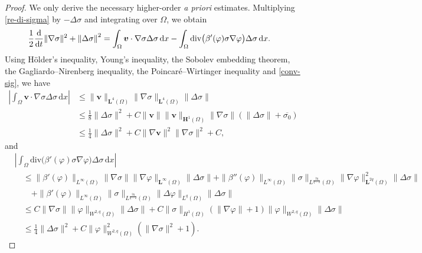 \documentclass[10pt,a4paper]{amsart}
\def\L{\bm{L}}
\def\vv{\bm{v}}
\begin{document}
\begin{proof}
We only derive the necessary higher-order \textit{a priori} estimates.
Multiplying \eqref{re-di-sigma} by $-\Delta\sigma$ and integrating over $\Omega$, we obtain
%
\begin{equation}
\begin{aligned}
\frac{1}{2}\frac{\mathrm{d}}{\mathrm{d} t}\|\nabla \sigma\|^2+\left\|\Delta\sigma\right\|^2
&=\int_{\Omega}\vv \cdot \nabla \sigma\Delta\sigma\,\mathrm{d}x
- \int_{\Omega}\mathrm{div}\big(\beta'(\varphi)\sigma \nabla \varphi\big) \Delta\sigma \,\mathrm{d}x.
\end{aligned}
\notag
\end{equation}
%
Using H\"older's inequality, Young's inequality, the Sobolev embedding theorem, the Gagliardo--Nirenberg inequality, the Poincar\'e--Wirtinger inequality and \eqref{conv-sig}, we have
%
\begin{equation*}
\begin{aligned}
\left|\int_{\Omega}\vv \cdot \nabla \sigma \Delta\sigma \,\mathrm{d}x\right|
&\le \|\vv \|_{\L^4(\Omega)}\|\nabla \sigma\|_{\bm{L}^4(\Omega)}\|\Delta\sigma\|\\
&\le \frac18\|\Delta\sigma\|^2 + C\|\vv \|\|\vv \|_{\bm{H}^1(\Omega)}
\|\nabla \sigma\| (\|\Delta\sigma\| + \overline{\sigma_0}) \\
&\le \frac14\|\Delta\sigma\|^2 + C\|\nabla \vv \|^2\|\nabla \sigma\|^2+C,
\end{aligned}
\end{equation*}
and
\begin{equation*}
\begin{aligned}
&\left|\int_{\Omega}\mathrm{div}\big(\beta'(\varphi)\sigma \nabla \varphi\big) \Delta\sigma \,\mathrm{d}x\right|
\\
&\quad\le \|\beta'(\varphi)\|_{L^\infty(\Omega)}\|\nabla \sigma\|\|\nabla \varphi\|_{\bm{L}^\infty(\Omega)}\|\Delta\sigma\|
+ \|\beta''(\varphi)\|_{L^\infty(\Omega)}\|\sigma\|_{L^\frac{2q}{q-2}(\Omega)} \|\nabla \varphi\|^2_{\bm{L}^{2q}(\Omega)}\|\Delta\sigma\|
\\
&\qquad +\|\beta'(\varphi)\|_{L^\infty(\Omega)}\|\sigma\|_{L^\frac{2q}{q-2}(\Omega)} \|\Delta \varphi\|_{L^q(\Omega)}\|\Delta\sigma\| \\
&\quad \leq C \|\nabla \sigma\|\|\varphi\|_{W^{2,q}(\Omega)}\|\Delta \sigma\|
+ C
\| \sigma \|_{H^1(\Omega)}
(\| \nabla \varphi\| +1)
 \| \varphi\|_{W^{2,q}(\Omega)} \| \Delta \sigma\|
\\
&\quad\le \frac14\|\Delta\sigma\|^2
+ C\|\varphi\|_{W^{2,q}(\Omega)}^2(\|\nabla \sigma\|^2+1).

\end{aligned}
\end{equation*}
\end{proof}
\end{document}
